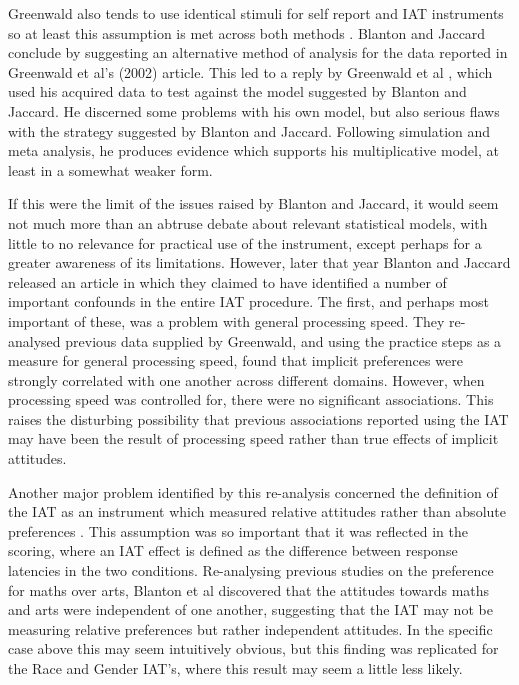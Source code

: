 Greenwald also tends to use identical stimuli for self report and IAT instruments so at least this assumption is met across both methods \cite{Farnham1999,Greenwald1998}. Blanton and Jaccard conclude by suggesting an alternative method of analysis for the data reported in Greenwald et al's (2002) article. This led to a reply by Greenwald et al \cite{Greenwald2006b}, which used his acquired data to test against the model suggested by Blanton and Jaccard. He discerned some problems with his own model, but also serious flaws with the strategy suggested by Blanton and Jaccard. Following simulation and meta analysis, he produces evidence which supports his multiplicative model, at least in a somewhat weaker form. 

If this were the limit of the issues raised by Blanton and Jaccard, it would seem not much more than an abtruse debate about relevant statistical models, with little to no relevance for practical use of the instrument, except perhaps for a greater awareness of its limitations. However, later that year Blanton and Jaccard released an article \cite{Blanton2006} in which they claimed to have identified a number of important confounds in the entire IAT procedure. The first, and perhaps most important of these, was a problem with general processing speed. They re-analysed previous data supplied by Greenwald, and using the practice steps as a measure for general processing speed, found that implicit preferences were strongly correlated with one another across different domains. However, when processing speed was controlled for, there were no significant associations. This raises the disturbing possibility that previous associations reported using the IAT may have been the result of processing speed rather than true effects of implicit attitudes. 

Another major problem identified by this re-analysis concerned the definition of the IAT as an instrument which measured relative attitudes rather than absolute preferences \cite{Greenwald1998} . This assumption was so important that it was reflected in the scoring, where an IAT effect is defined as the difference between response latencies in the two conditions. Re-analysing previous studies on the preference for maths over arts, Blanton et al discovered that the attitudes towards maths and arts were independent of one another, suggesting that the IAT may not be measuring relative preferences but rather independent attitudes. In the specific case above this may seem intuitively obvious, but this finding was replicated for the Race and Gender IAT's, where this result may seem a little less likely. 

